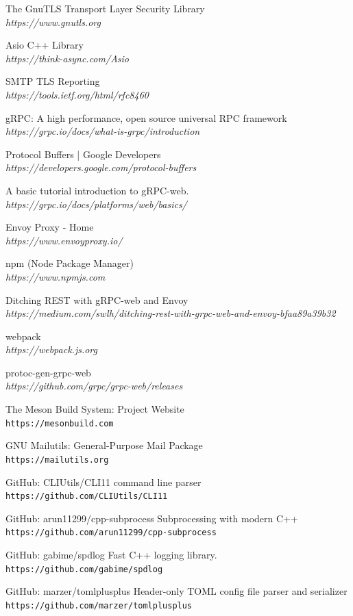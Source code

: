 \documentclass[12pt]{article}
\begin{document}
\begin{thebibliography}{25}
The GnuTLS Transport Layer Security Library
\\\textit{https://www.gnutls.org}

Asio C++ Library
\\\textit{https://think-async.com/Asio}

SMTP TLS Reporting
\\\textit{https://tools.ietf.org/html/rfc8460}

gRPC: A high performance, open source universal RPC framework
\\\textit{https://grpc.io/docs/what-is-grpc/introduction}

Protocol Buffers | Google Developers
\\\textit{https://developers.google.com/protocol-buffers}

A basic tutorial introduction to gRPC-web.
\\\textit{https://grpc.io/docs/platforms/web/basics/}

Envoy Proxy - Home
\\\textit{https://www.envoyproxy.io/}

npm (Node Package Manager)
\\\textit{https://www.npmjs.com}

Ditching REST with gRPC-web and Envoy
\\\textit{https://medium.com/swlh/ditching-rest-with-grpc-web-and-envoy-bfaa89a39b32}

webpack
\\\textit{https://webpack.js.org}

protoc-gen-grpc-web
\\\textit{https://github.com/grpc/grpc-web/releases}

The Meson Build System: Project Website
\\\texttt{https://mesonbuild.com}

GNU Mailutils: General-Purpose Mail Package
\\\texttt{https://mailutils.org}

GitHub: CLIUtils/CLI11 command line parser
\\\texttt{https://github.com/CLIUtils/CLI11}

GitHub:  arun11299/cpp-subprocess Subprocessing with modern C++ 
\\\texttt{https://github.com/arun11299/cpp-subprocess}

GitHub:  gabime/spdlog Fast C++ logging library. 
\\\texttt{https://github.com/gabime/spdlog}

GitHub:  marzer/tomlplusplus Header-only TOML config file parser and serializer
\\\texttt{https://github.com/marzer/tomlplusplus}

\end{thebibliography}
\end{document}
